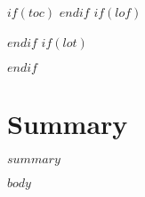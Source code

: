 \documentclass[$if(fontsize)$$fontsize$,$endif$$if(lang)$$lang$,$endif$$if(papersize)$$papersize$,$endif$$for(classoption)$$classoption$$sep$,$endfor$preprint, authoryear]{$documentclass$}
\title{
{\scshape\Large $institute$}\\
{\vskip 2.5em \scshape $title$}\\
}
\author{$author$}
\subtitle{\vspace{4em} $subtitle$} %
\date{\scshape $date$}
\numberwithin{equation}{section}
\begin{document}
\pagestyle{fancy}


\maketitle

\thispagestyle{empty}

\clearpage

\setcounter{page}{1}

$if(toc)$
\renewcommand{\contentsname}{Table of Contents}
\hypersetup{linkcolor=black}
\tableofcontents
$endif$
\newpage
$if(lof)$
\hypersetup{linkcolor=black}
\listoffigures
$endif$
\newpage
$if(lot)$
\hypersetup{linkcolor=black}
\listoftables
$endif$
\hypersetup{linkcolor=black}
\newpage

\section*{Summary}

$summary$

\clearpage


$body$

\newcommand\wordcount{
    \immediate\write18{texcount -sub=section \jobname.tex  | grep "Section" |     sed -e 's/+.*//' | sed -n \thesection p > 'count.txt'}
(words)}
\end{document}
